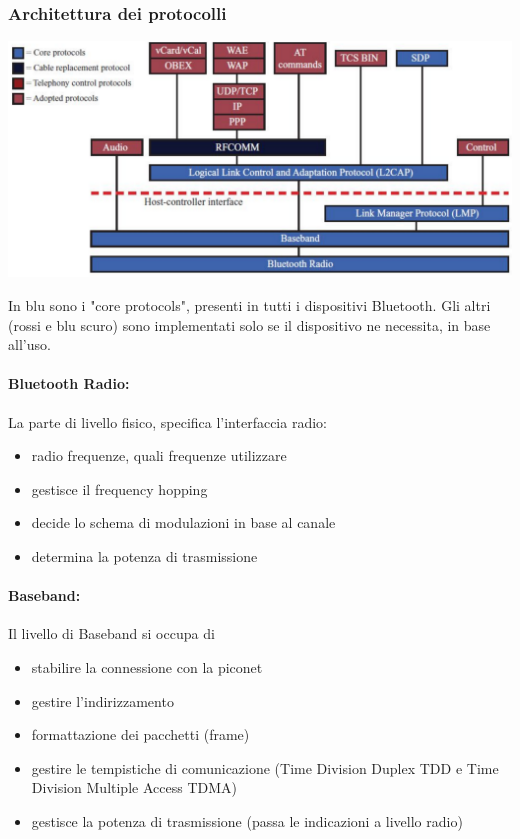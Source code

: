 \newpage

\subsubsection{Architettura dei protocolli} 
\begin{center}
	\includegraphics[width=0.95\linewidth]{img/wpan/archbt}
\end{center}
In blu sono i "core protocols", presenti in tutti i dispositivi Bluetooth. Gli altri (rossi e blu scuro) sono implementati solo se il dispositivo ne necessita, in base all'uso.\\

\paragraph{Bluetooth Radio:} La parte di livello fisico, specifica l'interfaccia radio: 
\begin{itemize}
	\item radio frequenze, quali frequenze utilizzare
	\item gestisce il frequency hopping
	\item decide lo schema di modulazioni in base al canale
	\item determina la potenza di trasmissione
\end{itemize}

\paragraph{Baseband:} Il livello di Baseband si occupa di 
\begin{itemize}
	\item stabilire la connessione con la piconet
	\item gestire l'indirizzamento
	\item formattazione dei pacchetti (frame)
	\item gestire le tempistiche di comunicazione (Time Division Duplex TDD e Time Division Multiple Access TDMA)
	\item gestisce la potenza di trasmissione (passa le indicazioni a livello radio)
\end{itemize}


